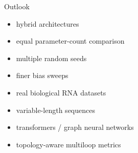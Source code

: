 \documentclass{beamer}
\begin{document}
\begin{frame}{Outlook}
  \vfill
  \begin{minipage}{0.48\textwidth}
    \large
    \begin{itemize}
      \item hybrid architectures
      \item equal parameter-count comparison
      \item multiple random seeds
      \item finer bias sweeps
    \end{itemize}
  \end{minipage}\hfill
  \begin{minipage}{0.48\textwidth}
    \large
    \begin{itemize}
      \item real biological RNA datasets
      \item variable-length sequences
      \item transformers / graph neural networks
      \item topology-aware multiloop metrics
    \end{itemize}
  \end{minipage}
  \vfill
\end{frame}
\end{document}
